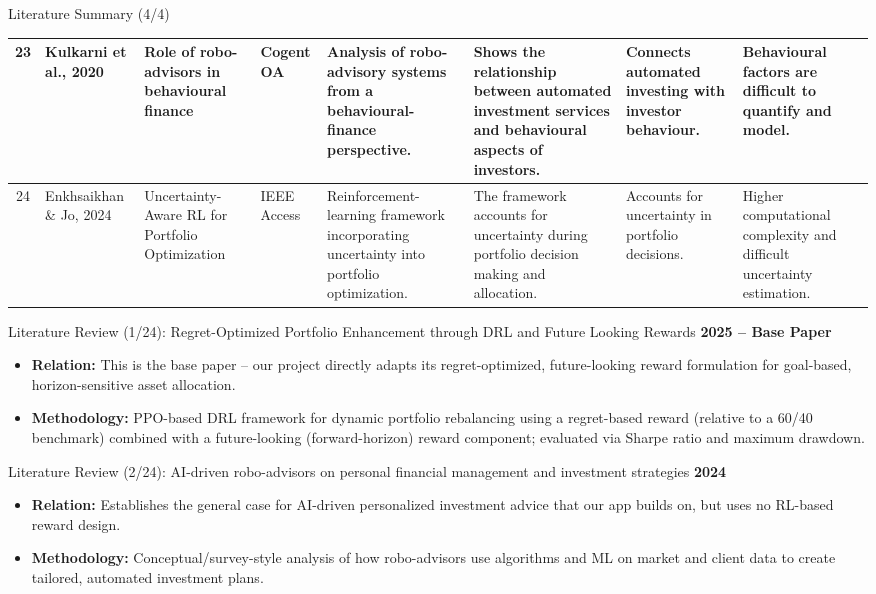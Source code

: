 \documentclass{beamer}
\begin{document}
\begin{frame}{Literature Summary (4/4)}
{\begin{tabular}{c p{1.8cm} p{2.5cm} p{1.5cm} p{2.8cm} p{2.8cm} p{2.5cm} p{2.5cm}}
\midrule

23 &
Kulkarni et al., 2020 &
Role of robo-advisors in behavioural finance &
Cogent OA &
Analysis of robo-advisory systems from a behavioural-finance perspective. &
Shows the relationship between automated investment services and behavioural aspects of investors. &
Connects automated investing with investor behaviour. &
Behavioural factors are difficult to quantify and model. \\

\midrule

24 &
Enkhsaikhan \& Jo, 2024 &
Uncertainty-Aware RL for Portfolio Optimization &
IEEE Access &
Reinforcement-learning framework incorporating uncertainty into portfolio optimization. &
The framework accounts for uncertainty during portfolio decision making and allocation. &
Accounts for uncertainty in portfolio decisions. &
Higher computational complexity and difficult uncertainty estimation. \\

\bottomrule
\end{tabular}%
}

\end{frame}

\begin{frame}{Literature Review (1/24): Regret-Optimized Portfolio Enhancement through DRL and Future Looking Rewards}
\small
\textbf{2025 -- Base Paper}
\begin{itemize}
    \item \textbf{Relation:} This is the base paper -- our project directly adapts its regret-optimized, future-looking reward formulation for goal-based, horizon-sensitive asset allocation.
    \item \textbf{Methodology:} PPO-based DRL framework for dynamic portfolio rebalancing using a regret-based reward (relative to a 60/40 benchmark) combined with a future-looking (forward-horizon) reward component; evaluated via Sharpe ratio and maximum drawdown.
\end{itemize}
\end{frame}

\begin{frame}{Literature Review (2/24): AI-driven robo-advisors on personal financial management and investment strategies}
\small
\textbf{2024}
\begin{itemize}
    \item \textbf{Relation:} Establishes the general case for AI-driven personalized investment advice that our app builds on, but uses no RL-based reward design.
    \item \textbf{Methodology:} Conceptual/survey-style analysis of how robo-advisors use algorithms and ML on market and client data to create tailored, automated investment plans.
\end{itemize}
\end{frame}
\end{document}

